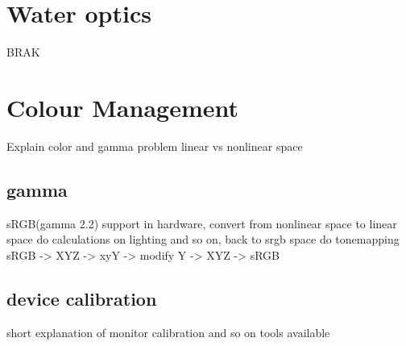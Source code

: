 \section{Water optics}
BRAK

\section{Colour Management}

Explain color and gamma problem
linear vs nonlinear space

\subsection{gamma}
sRGB(gamma 2.2) support in hardware, convert from nonlinear space to linear
space do calculations on lighting and so on, back to srgb space
do tonemapping sRGB -> XYZ -> xyY -> modify Y -> XYZ -> sRGB

\subsection{device calibration}
short explanation of monitor calibration and so on
tools available


